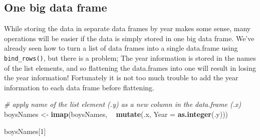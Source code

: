 \documentclass[]{book}
\newenvironment{Shaded}{\begin{snugshade}}{\end{snugshade}}
\newcommand{\CommentTok}[1]{\textcolor[rgb]{0.56,0.35,0.01}{\textit{#1}}}
\newcommand{\DataTypeTok}[1]{\textcolor[rgb]{0.13,0.29,0.53}{#1}}
\newcommand{\DecValTok}[1]{\textcolor[rgb]{0.00,0.00,0.81}{#1}}
\newcommand{\KeywordTok}[1]{\textcolor[rgb]{0.13,0.29,0.53}{\textbf{#1}}}
\newcommand{\NormalTok}[1]{#1}
\newcommand{\OperatorTok}[1]{\textcolor[rgb]{0.81,0.36,0.00}{\textbf{#1}}}
\newcommand{\StringTok}[1]{\textcolor[rgb]{0.31,0.60,0.02}{#1}}
\begin{document}
\begin{Shaded}
\end{Shaded}

\hypertarget{one-big-data-frame}{%
\subsection{One big data frame}\label{one-big-data-frame}}

While storing the data in separate data frames by year makes some sense,
many operations will be easier if the data is simply stored in one big
data frame. We've already seen how to turn a list of data frames into a
single data.frame using \texttt{bind\_rows()}, but there is a problem; The year
information is stored in the names of the list elements, and so
flattening the data.frames into one will result in losing the year
information! Fortunately it is not too much trouble to add the year
information to each data frame before flattening.

\begin{Shaded}
\begin{Highlighting}[]
\CommentTok{# apply name of the list element (.y) as a new column in the data.frame (.x)}
\NormalTok{boysNames <-}\StringTok{ }\KeywordTok{imap}\NormalTok{(boysNames, }\OperatorTok{~}\StringTok{ }\KeywordTok{mutate}\NormalTok{(.x, }\DataTypeTok{Year =} \KeywordTok{as.integer}\NormalTok{(.y)))}

\NormalTok{boysNames[}\DecValTok{1}\NormalTok{]}
\end{Highlighting}
\end{Shaded}
\end{document}

